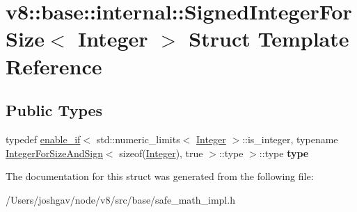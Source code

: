 \hypertarget{structv8_1_1base_1_1internal_1_1_signed_integer_for_size}{}\section{v8\+:\+:base\+:\+:internal\+:\+:Signed\+Integer\+For\+Size$<$ Integer $>$ Struct Template Reference}
\label{structv8_1_1base_1_1internal_1_1_signed_integer_for_size}
\subsection*{Public Types}
\begin{DoxyCompactItemize}
\item 
typedef \hyperlink{structv8_1_1base_1_1internal_1_1enable__if}{enable\+\_\+if}$<$ std\+::numeric\+\_\+limits$<$ \hyperlink{classv8_1_1_integer}{Integer} $>$\+::is\+\_\+integer, typename \hyperlink{structv8_1_1base_1_1internal_1_1_integer_for_size_and_sign}{Integer\+For\+Size\+And\+Sign}$<$ sizeof(\hyperlink{classv8_1_1_integer}{Integer}), true $>$\+::type $>$\+::type {\bfseries type}\hypertarget{structv8_1_1base_1_1internal_1_1_signed_integer_for_size_af8a9ac8802ec99183ef49ecfb496eefa}{}\label{structv8_1_1base_1_1internal_1_1_signed_integer_for_size_af8a9ac8802ec99183ef49ecfb496eefa}

\end{DoxyCompactItemize}


The documentation for this struct was generated from the following file\+:\begin{DoxyCompactItemize}
\item 
/\+Users/joshgav/node/v8/src/base/safe\+\_\+math\+\_\+impl.\+h\end{DoxyCompactItemize}
